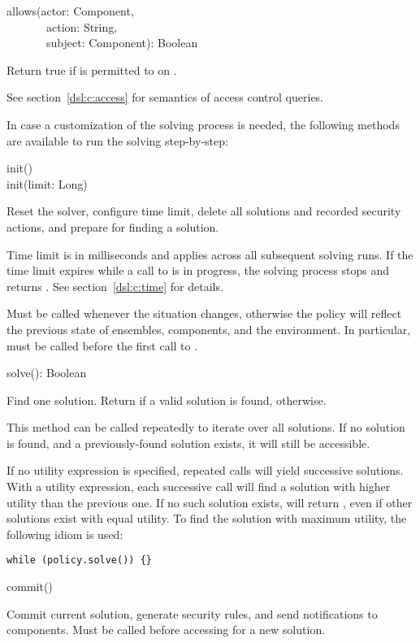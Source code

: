 \begin{dslsig}
allows(actor: Component,\\
~~~~~~~action: String,\\
~~~~~~~subject: Component): Boolean
\end{dslsig}
\begin{dsldesc}
    Return true if  is permitted to  on .

    See section~\ref{dsl:c:access} for semantics of access control queries.
\end{dsldesc}

\bigskip
\noindent
In case a customization of the solving process is needed, the following methods are
available to run the solving step-by-step:

\begin{dslsig}
init() \\
init(limit: Long)
\end{dslsig}
\begin{dsldesc}
    Reset the solver, configure time limit, delete all solutions and recorded security
    actions, and prepare for finding a solution.

    Time limit is in milliseconds and applies across all subsequent solving runs. If
    the time limit expires while a call to  is in progress, the solving
    process stops and  returns . See section~\ref{dsl:c:time} for
    details.

    Must be called whenever the situation changes, otherwise the policy will reflect the
    previous state of ensembles, components, and the environment. In particular, must be
    called before the first call to .
\end{dsldesc}

\begin{dslsig}
solve(): Boolean
\end{dslsig}
\begin{dsldesc}
    Find one solution. Return  if a valid solution is found, 
    otherwise.
    
    This method can be called repeatedly to iterate over all solutions. If no solution
    is found, and a previously-found solution exists, it will still be accessible.
    
    If no utility expression is specified, repeated calls will yield successive
    solutions. With a utility expression, each successive call will find a solution with
    higher utility than the previous one. If no such solution exists,  will
    return , even if other solutions exist with equal utility. To find the
    solution with maximum utility, the following idiom is used:\nopagebreak
\begin{lstlisting}[style=snippet]
while (policy.solve()) {}
\end{lstlisting}
\end{dsldesc}

\begin{dslsig}
commit()
\end{dslsig}
\begin{dsldesc}
    Commit current solution, generate security rules, and send notifications to
    components. Must be called before accessing  for a new solution.
\end{dsldesc}
